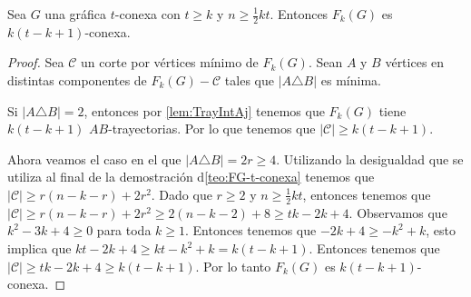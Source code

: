 \begin{teorema}%
    \label{teo:FG_k(t- k+ 1)-conexa}
        Sea $G$ una gr\'afica $t$-conexa con $t \ge k$ y $n \ge \frac{1}{2} kt$.
        Entonces $F_{k}(G)$ es $k (t- k+ 1)$-conexa.
    \end{teorema}

    \begin{proof}
        Sea $\mathcal{C}$ un corte por v\'ertices m\'inimo de $F_k(G)$. Sean
        $A$ y $B$ v\'ertices en distintas componentes de $F_k(G)- \mathcal{C}$
        tales que $|A \triangle B|$ es m\'inima.

        Si $|A \triangle B| = 2$, entonces por \cref{lem:TrayIntAj} tenemos que
        $F_k(G)$ tiene $k (t- k+ 1)$ $AB$-trayectorias. Por lo que tenemos que
        $|\mathcal{C}| \geq k (t- k+ 1)$.

        Ahora veamos el caso en el que $|A \triangle B| = 2r \ge 4$. Utilizando
        la desigualdad que se utiliza al final de la demostraci\'on
        d\cref{teo:FG-t-conexa} tenemos que $|\mathcal{C}| \ge r(n-k-r)+2r^2$. Dado
        que $r \ge 2$ y $n \ge \frac{1}{2}kt$, entonces tenemos que
        $|\mathcal{C}| \ge r(n-k-r)+2r^2 \ge 2 (n- k -2) + 8 \ge tk - 2k+ 4$.
        Observamos que $k^2 -3k + 4 \ge 0$ para toda $k \ge 1$. Entonces tenemos
        que $-2k+4 \ge -k^2 + k$, esto implica que $kt -2k +4 \ge kt - k^2 + k =
        k (t - k +1)$. Entonces tenemos que $|\mathcal{C}| \ge tk -2k +4 \ge
        k(t-k+1)$. Por lo tanto $F_k(G)$ es $k(t-k+1)$-conexa.
    \end{proof}
